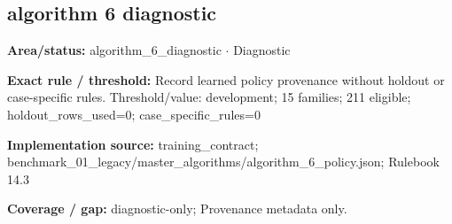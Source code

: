 \subsection*{algorithm 6 diagnostic}
\begin{tcolorbox}[enhanced,breakable,colback=white,colframe=Muted!45,boxrule=0.45pt,arc=1.5pt,left=6pt,right=6pt,top=5pt,bottom=5pt,title={\texttt{A6-TRAINING-CONTRACT-11}},title after break={\texttt{A6-TRAINING-CONTRACT-11}\ (continued)},fonttitle=\headingfont\bfseries\color{Navy},coltitle=Navy]
\textbf{Area/status:} algorithm\_\allowbreak{}6\_\allowbreak{}diagnostic $\boldsymbol{\cdot}$ Diagnostic\par
\smallskip
\textbf{Exact rule / threshold:} Record learned policy provenance without holdout or case-specific rules. Threshold/\allowbreak{}value: development; 15 families; 211 eligible; holdout\_\allowbreak{}rows\_\allowbreak{}used=0; case\_\allowbreak{}specific\_\allowbreak{}rules=0\par
\smallskip
\textbf{Implementation source:} training\_\allowbreak{}contract; benchmark\_\allowbreak{}01\_\allowbreak{}legacy/\allowbreak{}master\_\allowbreak{}algorithms/\allowbreak{}algorithm\_\allowbreak{}6\_\allowbreak{}policy.json; Rulebook 14.3\par
\smallskip
\textbf{Coverage / gap:} diagnostic-only; Provenance metadata only.
\end{tcolorbox}
\medskip
